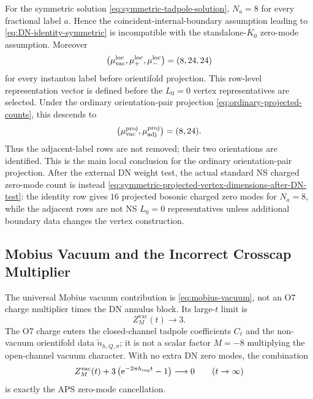 \documentclass[11pt]{article}
\newcommand{\wt}{\widetilde}
\newcommand{\vac}{\mathrm{vac}}
\newcommand{\e}{\mathrm{e}}
\begin{document}
For the symmetric solution \eqref{eq:symmetric-tadpole-solution}, $N_a=8$ for every fractional
label $a$. Hence the coincident-internal-boundary assumption leading to
\eqref{eq:DN-identity-symmetric} is incompatible with the standalone-\(K_0\) zero-mode
assumption. Moreover
\begin{equation}
  \bigl(\mu_{\vac}^{\rm loc},\mu_+^{\rm loc},\mu_-^{\rm loc}\bigr)
  =
  (8,24,24)
  \label{eq:symmetric-zero-mode-vector}
\end{equation}
for every instanton label before orientifold projection. This row-level representation vector is
defined before the \(L_0=0\) vertex representatives are selected. Under the ordinary orientation-pair
projection \eqref{eq:ordinary-projected-counts}, this descends to
\begin{equation}
  \bigl(\mu_{\vac}^{\rm proj},\mu_{\rm adj}^{\rm proj}\bigr)
  =
  (8,24).
  \label{eq:symmetric-projected-zero-mode-vector}
\end{equation}
Thus the adjacent-label rows are not removed; their two orientations are identified. This is the
main local conclusion for the ordinary orientation-pair projection. After the external DN weight
test, the actual standard NS charged zero-mode count is instead
\eqref{eq:symmetric-projected-vertex-dimensions-after-DN-test}: the identity row gives
\(16\) projected bosonic charged zero modes for \(N_a=8\), while the adjacent rows are not NS
\(L_0=0\) representatives unless additional boundary data changes the vertex construction.

\subsection{Mobius Vacuum and the Incorrect Crosscap Multiplier}

The universal Mobius vacuum contribution is \eqref{eq:mobius-vacuum}, not an O7 charge
multiplier times the DN annulus block. Its large-$t$ limit is
\begin{equation}
  Z_M^{\vac}(t)\longrightarrow 3.
  \label{eq:mobius-vacuum-limit}
\end{equation}
The O7 charge enters the closed-channel tadpole coefficients $C_\ell$ and the non-vacuum
orientifold data $\wt n_{h,Q,\sigma}$; it is not a scalar factor $M=-8$ multiplying the
open-channel vacuum character. With no extra DN zero modes, the combination
\begin{equation}
  Z_M^{\vac}(t)
  +
  3\left(\e^{-2\pi h_{\rm reg}t}-1\right)
  \longrightarrow 0
  \qquad (t\to\infty)
  \label{eq:universal-zero-mode-cancellation}
\end{equation}
is exactly the APS zero-mode cancellation.
\end{document}
